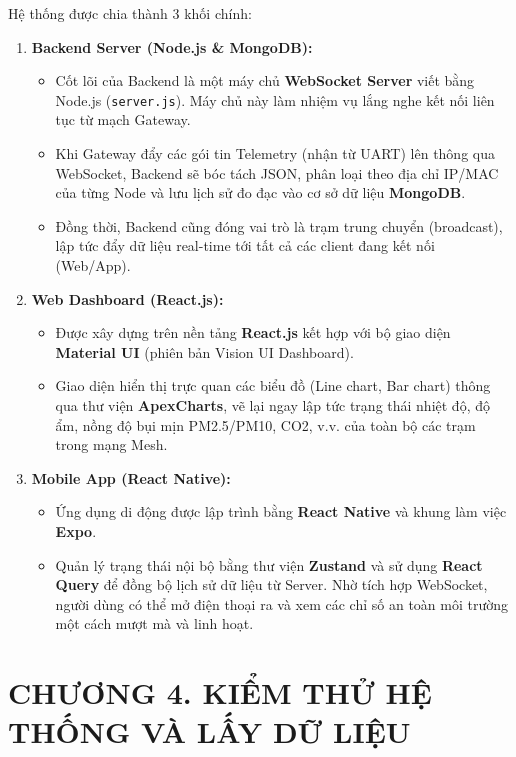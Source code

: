 \documentclass{article} %
\begin{document}
Hệ thống được chia thành 3 khối chính:
\begin{enumerate}
    \item \textbf{Backend Server (Node.js \& MongoDB):}
    \begin{itemize}
        \item Cốt lõi của Backend là một máy chủ \textbf{WebSocket Server} viết bằng Node.js (\texttt{server.js}). Máy chủ này làm nhiệm vụ lắng nghe kết nối liên tục từ mạch Gateway. 
        \item Khi Gateway đẩy các gói tin Telemetry (nhận từ UART) lên thông qua WebSocket, Backend sẽ bóc tách JSON, phân loại theo địa chỉ IP/MAC của từng Node và lưu lịch sử đo đạc vào cơ sở dữ liệu \textbf{MongoDB}.
        \item Đồng thời, Backend cũng đóng vai trò là trạm trung chuyển (broadcast), lập tức đẩy dữ liệu real-time tới tất cả các client đang kết nối (Web/App).
    \end{itemize}
    
    \item \textbf{Web Dashboard (React.js):}
    \begin{itemize}
        \item Được xây dựng trên nền tảng \textbf{React.js} kết hợp với bộ giao diện \textbf{Material UI} (phiên bản Vision UI Dashboard).
        \item Giao diện hiển thị trực quan các biểu đồ (Line chart, Bar chart) thông qua thư viện \textbf{ApexCharts}, vẽ lại ngay lập tức trạng thái nhiệt độ, độ ẩm, nồng độ bụi mịn PM2.5/PM10, CO2, v.v. của toàn bộ các trạm trong mạng Mesh.
    \end{itemize}
    
    \item \textbf{Mobile App (React Native):}
    \begin{itemize}
        \item Ứng dụng di động được lập trình bằng \textbf{React Native} và khung làm việc \textbf{Expo}.
        \item Quản lý trạng thái nội bộ bằng thư viện \textbf{Zustand} và sử dụng \textbf{React Query} để đồng bộ lịch sử dữ liệu từ Server. Nhờ tích hợp WebSocket, người dùng có thể mở điện thoại ra và xem các chỉ số an toàn môi trường một cách mượt mà và linh hoạt.
    \end{itemize}
\end{enumerate}
\newpage

\section*{CHƯƠNG 4. KIỂM THỬ HỆ THỐNG VÀ LẤY DỮ LIỆU}
\setcounter{section}{4}
\setcounter{subsection}{0}
\setcounter{figure}{0}
\setcounter{table}{0}
\end{document}
